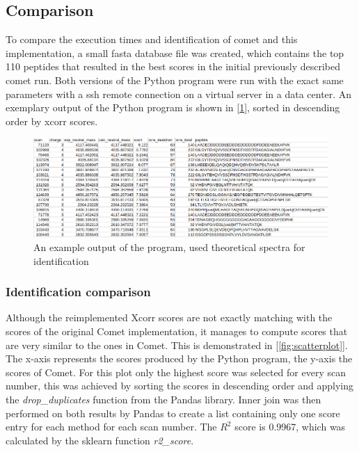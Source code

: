 \documentclass[11pt]{article}
\begin{document}
\subsection{Comparison}
To compare the execution times and identification of comet and this implementation, a small fasta database file was created, which contains the top 110 peptides that resulted in the best scores in the initial previously described comet run. Both versions of the Python program were run with the exact same parameters with a ssh remote connection on a virtual server in a data center.
An exemplary output of the Python program is shown in [\cref{fig:output}], sorted in descending order by xcorr scores.
\begin{figure}[ht]
\centering
\includegraphics[width=1\textwidth]{figs/output.png}
\caption{An example output of the program, used theoretical spectra for identification}
\label{fig:output}
\end{figure}

\subsubsection{Identification comparison}
Although the reimplemented Xcorr scores are not exactly matching with the scores of the original Comet implementation, it manages to compute scores that are very similar to the ones in Comet. This is demonstrated in [\cref{fig:scatterplot}]. The x-axis represents the scores produced by the Python program, the y-axis the scores of Comet. For this plot only the highest score was selected for every scan number, this was achieved by sorting the scores in descending order and applying the \textit{drop\_duplicates} function from the Pandas library. Inner join was then performed on both results by Pandas to create a list containing only one score entry for each method for each scan number. The \(R^2\) score is 0.9967, which was calculated by the sklearn function \textit{r2\_score}.
\end{document}
